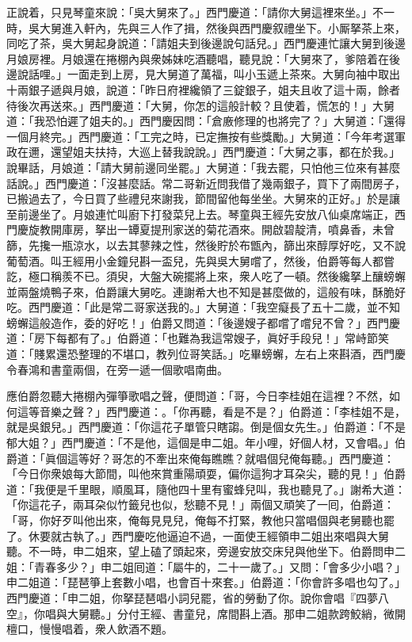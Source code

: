 正說着，只見琴童來說：「吳大舅來了。」西門慶道：「請你大舅這裡來坐。」不一時，吳大舅進入軒內，先與三人作了揖，然後與西門慶叙禮坐下。小厮拏茶上來，同吃了茶，吳大舅起身說道：「請姐夫到後邊說句話兒。」西門慶連忙讓大舅到後邊月娘房裡。月娘還在捲棚內與衆姊妹吃酒聽唱，聽見說：「大舅來了，爹陪着在後邊說話哩。」一面走到上房，見大舅道了萬福，叫小玉遞上茶來。大舅向袖中取出十兩銀子遞與月娘，說道：「昨日府裡纔領了三錠銀子，姐夫且收了這十兩，餘者待後次再送來。」西門慶道：「大舅，你怎的這般計較？且使着，慌怎的！」大舅道：「我恐怕遲了姐夫的。」西門慶因問：「倉廒修理的也將完了？」大舅道：「還得一個月終完。」西門慶道：「工完之時，已定撫按有些獎勵。」大舅道：「今年考選軍政在邇，還望姐夫扶持，大巡上替我說說。」西門慶道：「大舅之事，都在於我。」說畢話，月娘道：「請大舅前邊同坐罷。」大舅道：「我去罷，只怕他三位來有甚麼話說。」西門慶道：「沒甚麼話。常二哥新近問我借了幾兩銀子，買下了兩間房子，已搬過去了，今日買了些禮兒來謝我，節間留他每坐坐。大舅來的正好。」於是讓至前邊坐了。月娘連忙叫廚下打發菜兒上去。琴童與王經先安放八仙桌席端正，西門慶旋教開庫房，拏出一罈夏提刑家送的菊花酒來。開啟碧靛清，噴鼻香，未曾篩，先攙一瓶涼水，以去其蓼辣之性，然後貯於布甑內，篩出來醇厚好吃，又不說葡萄酒。叫王經用小金鐘兒斟一盃兒，先與吳大舅嚐了，然後，伯爵等每人都嘗訖，極口稱羨不已。須臾，大盤大碗擺將上來，衆人吃了一頓。然後纔拏上釀螃蠏並兩盤燒鴨子來，伯爵讓大舅吃。連謝希大也不知是甚麼做的，這般有味，酥脆好吃。西門慶道：「此是常二哥家送我的。」大舅道：「我空癡長了五十二歲，並不知螃蠏這般造作，委的好吃！」伯爵又問道：「後邊嫂子都嚐了嚐兒不曾？」西門慶道：「房下每都有了。」伯爵道：「也難為我這常嫂子，眞好手段兒！」常峙節笑道：「賤累還恐整理的不堪口，教列位哥笑話。」吃畢螃蠏，左右上來斟酒，西門慶令春鴻和書童兩個，在旁一遞一個歌唱南曲。

應伯爵忽聽大捲棚內彈箏歌唱之聲，便問道：「哥，今日李桂姐在這裡？不然，如何這等音樂之聲？」西門慶道：。「你再聽，看是不是？」伯爵道：「李桂姐不是，就是吳銀兒。」西門慶道：「你這花子單管只瞎謅。倒是個女先生。」伯爵道：「不是郁大姐？」西門慶道：「不是他，這個是申二姐。年小哩，好個人材，又會唱。」伯爵道：「眞個這等好？哥怎的不牽出來俺每瞧瞧？就唱個兒俺每聽。」西門慶道：「今日你衆娘每大節間，叫他來賞重陽頑耍，偏你這狗才耳朶尖，聽的見！」伯爵道：「我便是千里眼，順風耳，隨他四十里有蜜蜂兒叫，我也聽見了。」謝希大道：「你這花子，兩耳朶似竹籤兒也似，愁聽不見！」兩個又頑笑了一囘，伯爵道：「哥，你好歹叫他出來，俺每見見兒，俺每不打緊，教他只當唱個與老舅聽也罷了。休要就古執了。」西門慶吃他逼迫不過，一面使王經領申二姐出來唱與大舅聽。不一時，申二姐來，望上磕了頭起來，旁邊安放交床兒與他坐下。伯爵問申二姐：「青春多少？」申二姐囘道：「屬牛的，二十一歲了。」又問：「會多少小唱？」申二姐道：「琵琶箏上套數小唱，也會百十來套。」伯爵道：「你會許多唱也勾了。」西門慶道：「申二姐，你拏琵琶唱小詞兒罷，省的勞動了你。說你會唱『四夢八空』，你唱與大舅聽。」分付王經、書童兒，席間斟上酒。那申二姐款跨鮫綃，微開檀口，慢慢唱着，衆人飲酒不題。

